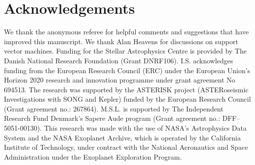 \documentclass[a4paper,fleqn,usenatbib]{mnras}
\begin{document}
\section*{Acknowledgements}

We thank the anonymous referee for helpful comments and suggestions that have improved this manuscript. We thank Alan Heavens for discussions on support vector machines. Funding for the Stellar Astrophysics Centre is provided by The Danish National Research Foundation (Grant DNRF106). I.S. acknowledges funding from the European Research Council (ERC) under the European Union’s Horizon 2020 research and innovation programme under grant agreement No 694513. The research was supported by the ASTERISK project (ASTERoseismic Investigations with SONG and Kepler) funded by the European Research Council (Grant agreement no.: 267864). M.S.L. is supported by The Independent Research Fund Denmark's Sapere Aude program (Grant agreement no.: DFF--5051-00130). This research was made with the use of NASA's Astrophysics Data System and the NASA Exoplanet Archive, which is operated by the California Institute of Technology, under contract with the National Aeronautics and Space Administration under the Exoplanet Exploration Program.








\clearpage
\end{document}
